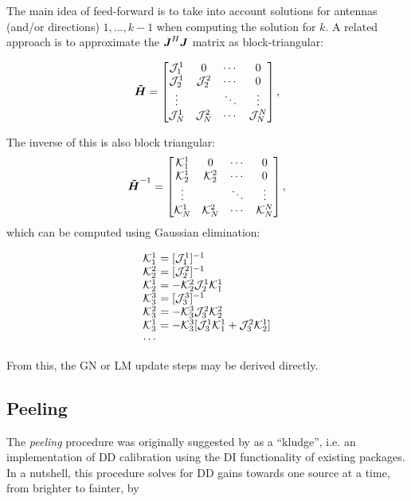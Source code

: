 \documentclass[useAMS,usenatbib]{mn2e}
\makeatletter
\newcommand{\mat}[1]{{\bmath{#1}}}
\newcommand{\JJ}{\mat{J}} %
\newcommand{\HHa}{\mat{\tilde{H}}} %
\newcommand{\JHJ}{\JJ^H\JJ} %
\newcommand{\Matrix}[2]{\left [ \begin{array}{@{}#1@{}}#2\end{array} \right ]}
\makeatother
\begin{document}
The main idea of feed-forward is to take into account solutions for antennas (and/or directions) $1,...,k-1$ when computing the
solution for $k$. A related approach is to approximate the $\JHJ$ matrix as block-triangular:

\begin{equation}
\label{eq:JHJ:DD:block-triag}
\HHa = \Matrix{cccc}{
\JJJ^1_1 & 0 & \cdots & 0 \\
\JJJ^1_2 & \JJJ^2_2 & \cdots & 0 \\
\vdots & & \ddots &  \vdots \\
\JJJ_{N}^1 & \JJJ_{N}^2 & \cdots & \JJJ_{N}^{N} },
\end{equation}

\newcommand{\KKK}{\mathcal{K}}

The inverse of this is also block triangular:
\begin{equation}
\label{eq:JHJ:DD:block-triag-inv}
\HHa^{-1} = \Matrix{cccc}{
\KKK^1_1 & 0 & \cdots & 0 \\
\KKK^1_2 & \KKK^2_2 & \cdots & 0 \\
\vdots & & \ddots &  \vdots \\
\KKK_{N}^1 & \KKK_{N}^2 & \cdots & \KKK_{N}^{N} },
\end{equation}
which can be computed using Gaussian elimination:

\[
\begin{array}{l@{~}l}
\KKK^1_1 &= [\JJJ^1_1]^{-1} \\
\KKK^2_2 &= [\JJJ^2_2]^{-1} \\
\KKK^1_2 &= - \KKK^2_2 \JJJ^1_2 \KKK^1_1\\
\KKK^3_3 &= [\JJJ^3_3]^{-1} \\
\KKK^2_3 &= - \KKK^3_3 \JJJ^2_3 \KKK^2_2\\
\KKK^1_3 &= - \KKK^3_3 [ \JJJ^1_3 \KKK^1_1 + \JJJ^2_3 \KKK^1_2  ]\\
\cdots
\end{array}
\]

From this, the GN or LM update steps may be derived directly.

\subsection{Peeling}
\label{sec:peeling}

The \emph{peeling} procedure was originally suggested by \citet{JEN:peeling} as a ``kludge'', i.e. an implementation of DD calibration 
using the DI functionality of existing packages. In a nutshell, this procedure solves for DD gains towards one source at a time, from
brighter to fainter, by
\end{document}
